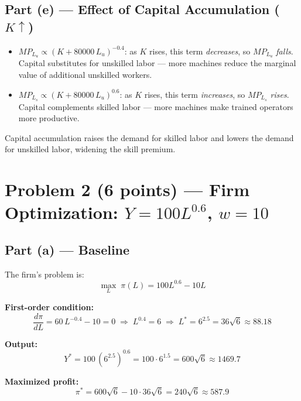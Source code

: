 \documentclass[12pt]{article}
\begin{document}
\subsection*{Part (e) --- Effect of Capital Accumulation ($K \uparrow$)}

\begin{itemize}[leftmargin=*]
    \item $MP_{L_u} \propto (K + 80000\,L_u)^{-0.4}$: as $K$ rises, this
    term \emph{decreases}, so $MP_{L_u}$ \emph{falls}. Capital substitutes
    for unskilled labor --- more machines reduce the marginal value of
    additional unskilled workers.

    \item $MP_{L_s} \propto (K + 80000\,L_u)^{0.6}$: as $K$ rises, this
    term \emph{increases}, so $MP_{L_s}$ \emph{rises}. Capital complements
    skilled labor --- more machines make trained operators more productive.
\end{itemize}

Capital accumulation raises the demand for skilled labor and lowers the demand
for unskilled labor, widening the skill premium.

\section*{Problem 2 (6 points) --- Firm Optimization: $Y = 100L^{0.6}$, $w = 10$}

\subsection*{Part (a) --- Baseline}

The firm's problem is:
\[
    \max_{L} \; \pi(L) = 100L^{0.6} - 10L
\]

\textbf{First-order condition:}
\[
    \frac{d\pi}{dL} = 60\,L^{-0.4} - 10 = 0
    \;\Longrightarrow\;
    L^{0.4} = 6
    \;\Longrightarrow\;
    L^* = 6^{2.5} = 36\sqrt{6} \approx 88.18
\]

\textbf{Output:}
\[
    Y^* = 100\,(6^{2.5})^{0.6} = 100 \cdot 6^{1.5} = 600\sqrt{6} \approx 1469.7
\]

\textbf{Maximized profit:}
\[
    \pi^* = 600\sqrt{6} - 10\cdot 36\sqrt{6} = 240\sqrt{6} \approx 587.9
\]
\end{document}
